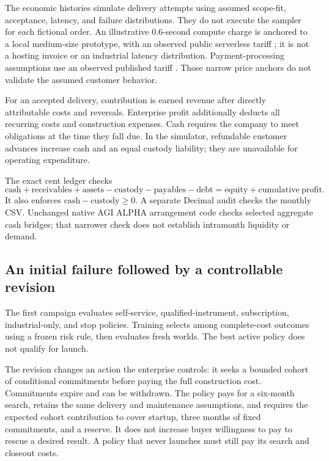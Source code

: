 \documentclass[11pt,letterpaper]{article}
\begin{document}
The economic histories simulate delivery attempts using assumed scope-fit,
acceptance, latency, and failure distributions. They do not execute the sampler
for each fictional order. An illustrative 0.6-second compute charge is anchored
to a local medium-size prototype, with an observed public serverless tariff
\cite{lambda}; it is not a hosting invoice or an industrial latency distribution.
Payment-processing assumptions use an observed published tariff \cite{stripe}.
Those narrow price anchors do not validate the assumed customer behavior.

For an accepted delivery, contribution is earned revenue after directly attributable
costs and reversals. Enterprise profit additionally deducts all recurring costs and
construction expenses. Cash requires the company to meet obligations at the time
they fall due. In the simulator, refundable customer advances increase cash and an
equal custody liability; they are unavailable for operating expenditure.

The exact cent ledger checks
\begin{equation}
\mathrm{cash}+\mathrm{receivables}+\mathrm{assets}
-\mathrm{custody}-\mathrm{payables}-\mathrm{debt}
=\mathrm{equity}+\mathrm{cumulative\ profit}.
\label{eq:balance}
\end{equation}
It also enforces $\mathrm{cash}-\mathrm{custody}\ge0$. A separate Decimal audit checks
the monthly CSV. Unchanged native AGI ALPHA arrangement code checks selected aggregate
cash bridges; that narrower check does not establish intramonth liquidity or demand.

\subsection{An initial failure followed by a controllable revision}

The first campaign evaluates self-service, qualified-instrument, subscription,
industrial-only, and stop policies. Training selects among complete-cost outcomes
using a frozen risk rule, then evaluates fresh worlds. The best active policy does
not qualify for launch.

The revision changes an action the enterprise controls: it seeks a bounded cohort
of conditional commitments before paying the full construction cost. Commitments
expire and can be withdrawn. The policy pays for a six-month search, retains the
same delivery and maintenance assumptions, and requires the expected cohort
contribution to cover startup, three months of fixed commitments, and a reserve.
It does not increase buyer willingness to pay to rescue a desired result. A policy
that never launches must still pay its search and closeout costs.
\end{document}
